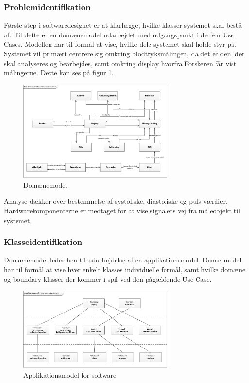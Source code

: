 \subsubsection{Problemidentifikation}
Første step i softwaredesignet er at klarlægge, hvilke klasser systemet skal bestå af. Til dette er en domænemodel udarbejdet med udgangspunkt i de fem Use Cases. Modellen har til formål at vise, hvilke dele systemet skal holde styr på. Systemet vil primært centrere sig omkring blodtryksmålingen, da det er den, der skal analyseres og bearbejdes, samt omkring display hvorfra Forskeren får vist målingerne. Dette kan ses på figur \ref{fig:Domaenemodel}.  
\begin{figure}[H]
	\centering
	\includegraphics[width=0.7\textwidth]{Figurer/DomaneModel}
	\caption{Domænemodel}
	\label{fig:Domaenemodel}
\end{figure}
Analyse dækker over bestemmelse af systoliske, diastoliske og puls værdier. Hardwarekomponenterne er medtaget for at vise signalets vej fra måleobjekt til systemet. 

\subsubsection{Klasseidentifikation}
Domænemodel leder hen til udarbejdelse af en applikationsmodel. Denne model har til formål at vise hver enkelt klasses individuelle formål, samt hvilke domæne og boundary klasser der kommer i spil ved den pågældende Use Case. 
\begin{figure}[H]
	\centering
	\includegraphics[width=0.7\textwidth]{Figurer/Applikationsmodel}
	\caption{Applikationsmodel for software}
	\label{fig:Applikationsmodellen}
\end{figure}

